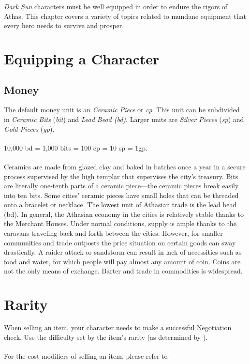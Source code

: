 \begin{multicols}{2}

\textit{Dark Sun} characters must be well equipped in order to endure the rigors of Athas.
This chapter covers a variety of topics related to mundane equipment that every
hero needs to survive and prosper.

\section{Equipping a Character}
\subsection{Money}
The default money unit is an \textit{Ceramic Piece} or \textit{cp}. This unit can be subdivided in
\textit{Ceramic Bits} (\textit{bit}) and \textit{Lead Bead (bd)}. Larger units are \textit{Silver Pieces} (\textit{sp}) and
\textit{Gold Pieces} (\textit{gp}).\\
\\
10,000 bd = 1,000 bits = 100 cp = 10 sp = 1gp.\\
\\
Ceramics are made from glazed clay and baked in batches once a year in a secure
process supervised by the high templar that supervises the city’s treasury. Bits
are literally one‐tenth parts of a ceramic piece—the ceramic pieces break easily
into ten bits. Some cities’ ceramic pieces have small holes that can be threaded
onto a bracelet or necklace. The lowest unit of Athasian trade is the lead bead
(bd).  In general, the Athasian economy in the cities is relatively stable thanks
to the Merchant Houses. Under normal conditions, supply is ample thanks to the
caravans traveling back and forth between the cities. However, for smaller
communities and trade outposts the price situation on certain goods can sway
drastically. A raider attack or sandstorm can result in lack of necessities such
as food and water, for which people will pay almost any amount of coin. Coins
are not the only means of exchange. Barter and trade in commodities is widespread.

\section{Rarity}\label{sec:equipment-rarity}

When selling an item, your character needs to make
a successful Negotiation check. Use the difficulty set by
the item's rarity (as determined by ).\\
\\
For the cost modifiers of selling an item, please refer to 


\end{multicols}
